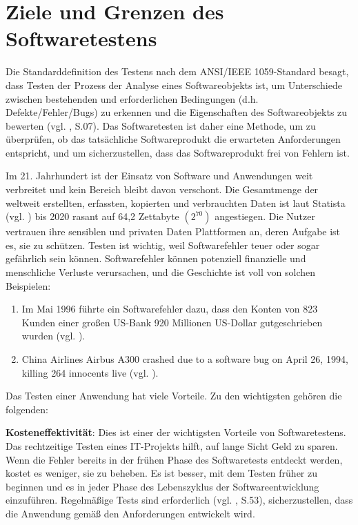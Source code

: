 \section{Ziele und Grenzen des Softwaretestens}

Die Standarddefinition des Testens nach dem
ANSI/IEEE 1059-Standard besagt, dass Testen der
Prozess der Analyse eines Softwareobjekts ist, um
Unterschiede zwischen bestehenden und erforderlichen
Bedingungen (d.h. Defekte/Fehler/Bugs) zu erkennen
und die Eigenschaften des Softwareobjekts zu bewerten (vgl. \cite{singh2012software}, S.07).
Das Softwaretesten ist daher eine Methode, um zu überprüfen,
ob das tatsächliche Softwareprodukt die erwarteten
Anforderungen entspricht, und um sicherzustellen, dass
das Softwareprodukt frei von Fehlern ist.

Im 21. Jahrhundert ist der Einsatz von Software und
Anwendungen weit verbreitet und kein Bereich bleibt
davon verschont. Die Gesamtmenge der weltweit erstellten,
erfassten, kopierten und verbrauchten Daten ist laut
Statista (vgl. \cite{Statista2021}) bis 2020 rasant auf 64,2
Zettabyte \begin{math}(2^{70})\end{math} angestiegen. Die Nutzer vertrauen ihre sensiblen und privaten Daten
Plattformen an, deren Aufgabe ist es, sie zu schützen. Testen
ist wichtig, weil Softwarefehler teuer oder sogar gefährlich
sein können. Softwarefehler können potenziell finanzielle
und menschliche Verluste verursachen, und die Geschichte
ist voll von solchen Beispielen:

\begin{enumerate}
    \item Im Mai 1996 führte ein Softwarefehler dazu, dass
     den Konten von 823 Kunden einer großen US-Bank 920
     Millionen US-Dollar gutgeschrieben wurden (vgl. \cite{Devi2015}).
    \item China Airlines Airbus A300 crashed due to a software bug on April 26,
     1994, killing 264 innocents live (vgl. \cite{Takeuch1996}).
\end{enumerate}

Das Testen einer Anwendung hat viele Vorteile. Zu den wichtigsten
gehören die folgenden:


 \textbf{Kosteneffektivität}: Dies ist einer der
wichtigsten Vorteile von Softwaretestens. Das
rechtzeitige Testen eines IT-Projekts hilft, auf
lange Sicht Geld zu sparen. Wenn die Fehler bereits in
der frühen Phase des Softwaretests entdeckt werden,
kostet es weniger, sie zu beheben. Es ist besser, mit
dem Testen früher zu beginnen und es in jeder Phase des
Lebenszyklus der Softwareentwicklung einzuführen.
Regelmäßige Tests sind erforderlich (vgl. \cite{kumar2010software}, S.53),
sicherzustellen, dass die Anwendung gemäß den Anforderungen entwickelt wird.

